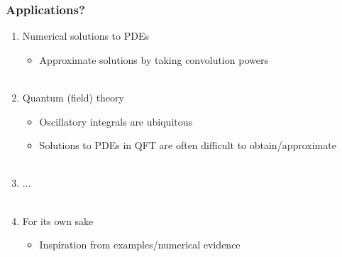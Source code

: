 \documentclass{beamer}
\theoremstyle{definition}
\begin{document}
\begin{frame}
\frametitle{Applications?}

\begin{enumerate}
	\item Numerical solutions to PDEs
	\begin{itemize}
		\item Approximate solutions by taking convolution powers\\
		$\,$\\
	\end{itemize}

\pause
	\item Quantum (field) theory
	\begin{itemize}
		\item Oscillatory integrals are ubiquitous
		\item Solutions to PDEs in QFT are often difficult to obtain/approximate\\
		$\,$\\
	\end{itemize}

\pause
	\item $\dots$\\
	$\,$\\
	
\pause

	\item For its own sake
	\begin{itemize}
		\item Inspiration from examples/numerical evidence
	\end{itemize}
\end{enumerate}

\end{frame}
\end{document}
